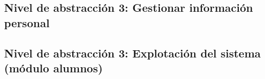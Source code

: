 \subsection{Nivel de abstracción 3: Gestionar información personal}



\subsection{Nivel de abstracción 3: Explotación del sistema (módulo alumnos)}

